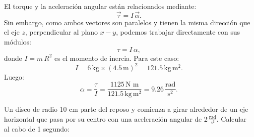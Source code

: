 \documentclass[addpoints]{exam}
\begin{document}
\begin{questions}
\begin{solution}
    El torque y la aceleración angular están relacionados mediante: $$ \vec{\tau} = I \, \vec{\alpha}. $$ Sin embargo, como ambos vectores son paralelos y tienen la misma dirección que el eje $z$, perpendicular al plano $x-y$, podemos trabajar directamente con sus módulos: $$ \tau = I \, \alpha, $$ donde $I = m \, R^2$ es el momento de inercia. Para este caso: $$ I = 6 \, \text{kg} \times \left(4.5 \, \text{m}\right)^2 = 121.5 \, \text{kg} \, \text{m}^2. $$ Luego: $$\alpha = \frac{\tau}{I} = \frac{1125 \, \text{N m}}{121.5 \, \text{kg} \, \text{m}^2} = 9.26 \, \frac{\text{rad}}{\text{s}^2}.$$
    \end{solution}

    \question Un disco de radio 10 cm parte del reposo y comienza a girar alrededor de un eje horizontal que pasa por su centro con una aceleración angular de $2 \, \frac{\text{rad}}{\text{s}^2}$. Calcular al cabo de 1 segundo:

    \begin{solution}
\end{solution}
\end{questions}
\end{document}
